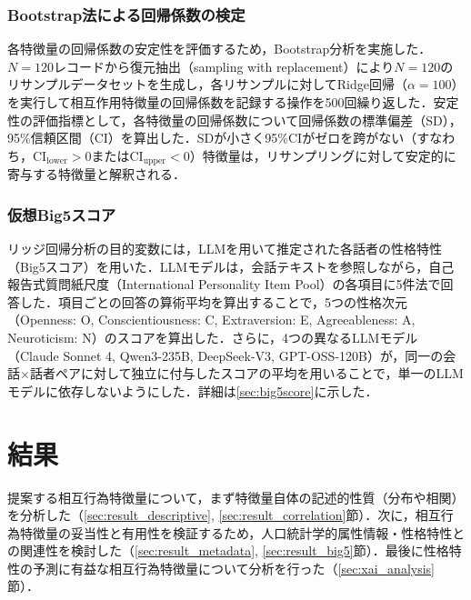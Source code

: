 \documentclass[dvipdfmx,11pt,a4paper]{bxjsarticle}
\renewcommand{\_}{\paperorigunderscore\allowbreak}%
\begin{document}
\subsubsection{Bootstrap法による回帰係数の検定}

各特徴量の回帰係数の安定性を評価するため，Bootstrap分析を実施した．$N = 120$レコードから復元抽出（sampling with replacement）により$N = 120$のリサンプルデータセットを生成し，各リサンプルに対してRidge回帰（$\alpha = 100$）を実行して相互作用特徴量の回帰係数を記録する操作を500回繰り返した．安定性の評価指標として，各特徴量の回帰係数について回帰係数の標準偏差（SD），95\%信頼区間（CI）を算出した．SDが小さく95\%CIがゼロを跨がない（すなわち，$\text{CI}_{\text{lower}} > 0$または$\text{CI}_{\text{upper}} < 0$）特徴量は，リサンプリングに対して安定的に寄与する特徴量と解釈される．


\subsubsection{仮想Big5スコア}
\label{sec:virtual_teacher}


リッジ回帰分析の目的変数には，LLMを用いて推定された各話者の性格特性（Big5スコア）を用いた．LLMモデルは，会話テキストを参照しながら，自己報告式質問紙尺度（International Personality Item Pool）の各項目に5件法で回答した．項目ごとの回答の算術平均を算出することで，5つの性格次元（Openness: O, Conscientiousness: C, Extraversion: E, Agreeableness: A, Neuroticism: N）のスコアを算出した．さらに，4つの異なるLLMモデル（Claude Sonnet 4, Qwen3-235B, DeepSeek-V3, GPT-OSS-120B）が，同一の会話$\times$話者ペアに対して独立に付与したスコアの平均を用いることで，単一のLLMモデルに依存しないようにした．詳細は\ref{sec:big5score}に示した．



\section{結果}
提案する相互行為特徴量について，まず特徴量自体の記述的性質（分布や相関）を分析した（\ref{sec:result_descriptive}, \ref{sec:result_correlation}節）．次に，相互行為特徴量の妥当性と有用性を検証するため，人口統計学的属性情報・性格特性との関連性を検討した（\ref{sec:result_metadata}, \ref{sec:result_big5}節）．最後に性格特性の予測に有益な相互行為特徴量について分析を行った（\ref{sec:xai_analysis}節）．
\end{document}

